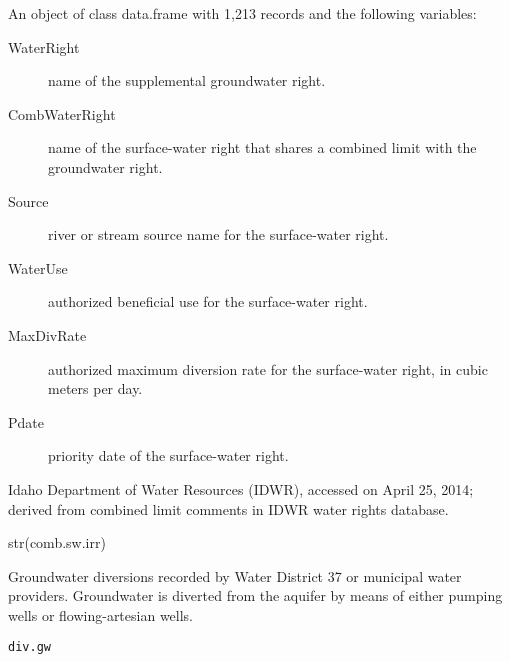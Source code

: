 \documentclass[a4paper]{book}
\begin{document}
%
\begin{Format}
An object of class data.frame with 1,213 records and the following variables:
\begin{description}

\item[WaterRight] name of the supplemental groundwater right.
\item[CombWaterRight] name of the surface-water right that shares a
combined limit with the groundwater right.
\item[Source] river or stream source name for the surface-water right.
\item[WaterUse] authorized beneficial use for the surface-water right.
\item[MaxDivRate] authorized maximum diversion rate for the surface-water right,
in cubic meters per day.
\item[Pdate] priority date of the surface-water right.

\end{description}
\end{Format}
%
\begin{Source}\relax
Idaho Department of Water Resources (IDWR), accessed on April 25, 2014;
derived from combined limit comments in IDWR water rights database.
\end{Source}
%
\begin{Examples}
\begin{ExampleCode}
str(comb.sw.irr)

\end{ExampleCode}
\end{Examples}
%
\begin{Description}\relax
Groundwater diversions recorded by Water District 37 or municipal water providers.
Groundwater is diverted from the aquifer by means of either pumping wells or
flowing-artesian wells.
\end{Description}
%
\begin{Usage}
\begin{verbatim}
div.gw
\end{verbatim}
\end{Usage}
%
\end{document}
